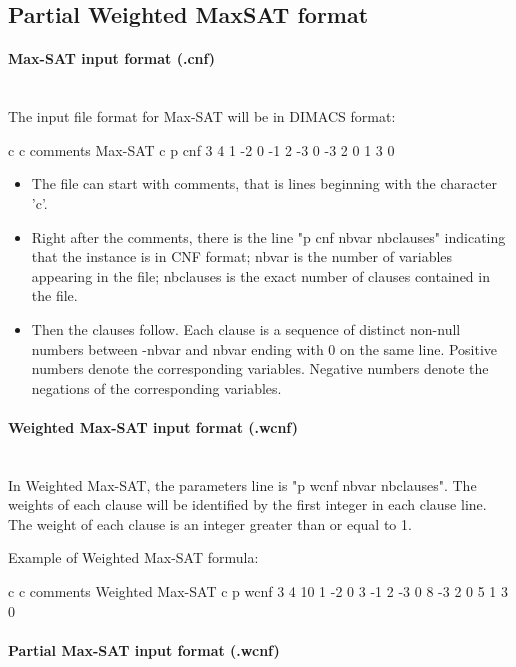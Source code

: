 \documentclass{article}
\begin{document}
\subsection{Partial Weighted MaxSAT format}

\paragraph{Max-SAT input format (.cnf)}~\\

The input file format for Max-SAT will be in DIMACS format:

\begin{DoxyCode}
c
c comments Max-SAT
c
p cnf 3 4
1 -2 0
-1 2 -3 0
-3 2 0
1 3 0
\end{DoxyCode}

\begin{itemize}
\item The file can start with comments, that is lines beginning with the character 'c'.
\item Right after the comments, there is the line "p cnf nbvar nbclauses" indicating that the instance is in CNF format; nbvar is the number of variables appearing in the file; nbclauses is the exact number of clauses contained in the file.
\item Then the clauses follow. Each clause is a sequence of distinct non-null numbers between -nbvar and nbvar ending with 0 on the same line. Positive numbers denote the corresponding variables. Negative numbers denote the negations of the corresponding variables.
\end{itemize}

\paragraph{Weighted Max-SAT input format (.wcnf)}~\\

In Weighted Max-SAT, the parameters line is "p wcnf nbvar nbclauses". The weights of each clause will be identified by the first integer in each clause line. The weight of each clause is an integer greater than or equal to 1.

Example of Weighted Max-SAT formula:

\begin{DoxyCode}
c
c comments Weighted Max-SAT
c
p wcnf 3 4
10 1 -2 0
3 -1 2 -3 0
8 -3 2 0
5 1 3 0
\end{DoxyCode}

\paragraph{Partial Max-SAT input format (.wcnf)}~\\
\end{document}
